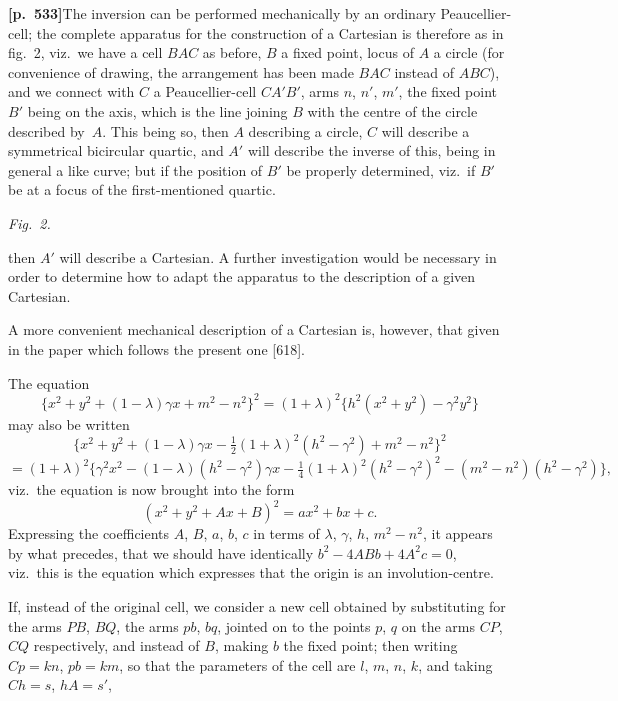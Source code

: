\documentclass[11pt,a4paper]{article}
\begin{document}
\noindent\textbf{[p.~533]}\quad The inversion can be performed mechanically by an ordinary Peaucellier-cell; the complete apparatus for the construction of a Cartesian is therefore as in fig.~2, viz.\ we have a cell $BAC$ as before, $B$ a fixed point, locus of $A$ a circle (for convenience of drawing, the arrangement has been made $BAC$ instead of $ABC$), and we connect with $C$ a Peaucellier-cell $CA'B'$, arms $n$, $n'$, $m'$, the fixed point $B'$ being on the axis, which is the line joining $B$ with the centre of the circle described by~$A$. This being so, then $A$ describing a circle, $C$ will describe a symmetrical bicircular quartic, and $A'$ will describe the inverse of this, being in general a like curve; but if the position of $B'$ be properly determined, viz.\ if $B'$ be at a focus of the first-mentioned quartic.

\begin{center}
\textit{Fig.~2.}
\end{center}

\bigskip

then $A'$ will describe a Cartesian. A further investigation would be necessary in order to determine how to adapt the apparatus to the description of a given Cartesian.

A more convenient mechanical description of a Cartesian is, however, that given in the paper which follows the present one [618].

The equation
\[
\{x^{2} + y^{2} + (1 - \lambda)\gamma x + m^{2} - n^{2}\}^{2} = (1 + \lambda)^{2}\{h^{2}(x^{2} + y^{2}) - \gamma^{2} y^{2}\}
\]
may also be written
\[
\{x^{2} + y^{2} + (1 - \lambda)\gamma x - \tfrac{1}{2}(1 + \lambda)^{2}(h^{2} - \gamma^{2}) + m^{2} - n^{2}\}^{2}
\]
\[
= (1 + \lambda)^{2}\{\gamma^{2} x^{2} - (1 - \lambda)(h^{2} - \gamma^{2})\gamma x - \tfrac{1}{4}(1 + \lambda)^{2}(h^{2} - \gamma^{2})^{2} - (m^{2} - n^{2})(h^{2} - \gamma^{2})\},
\]
viz.\ the equation is now brought into the form
\[
(x^{2} + y^{2} + Ax + B)^{2} = a x^{2} + b x + c.
\]
Expressing the coefficients $A$, $B$, $a$, $b$, $c$ in terms of $\lambda$, $\gamma$, $h$, $m^{2} - n^{2}$, it appears by what precedes, that we should have identically $b^{2} - 4ABb + 4A^{2}c = 0$, viz.\ this is the equation which expresses that the origin is an involution-centre.

If, instead of the original cell, we consider a new cell obtained by substituting for the arms $PB$, $BQ$, the arms $pb$, $bq$, jointed on to the points $p$, $q$ on the arms $CP$, $CQ$ respectively, and instead of $B$, making $b$ the fixed point; then writing $Cp = kn$, $pb = km$, so that the parameters of the cell are $l$, $m$, $n$, $k$, and taking $Ch = s$, $hA = s'$,
\end{document}
